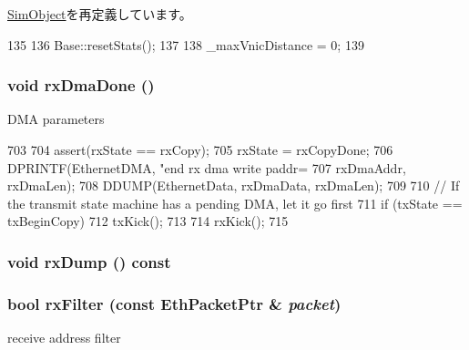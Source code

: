 \hyperlink{classSimObject_a65880e61108132689a1bd769b9187fb7}{SimObject}を再定義しています。


\begin{DoxyCode}
135 {
136     Base::resetStats();
137 
138     _maxVnicDistance = 0;
139 }
\end{DoxyCode}
\hypertarget{classSinic_1_1Device_ae8fff6d9b2bdd860ce365599560f67e7}{
\subsubsection[{rxDmaDone}]{\setlength{\rightskip}{0pt plus 5cm}void rxDmaDone ()}}
\label{classSinic_1_1Device_ae8fff6d9b2bdd860ce365599560f67e7}
DMA parameters 


\begin{DoxyCode}
703 {
704     assert(rxState == rxCopy);
705     rxState = rxCopyDone;
706     DPRINTF(EthernetDMA, "end rx dma write paddr=%
707             rxDmaAddr, rxDmaLen);
708     DDUMP(EthernetData, rxDmaData, rxDmaLen);
709 
710     // If the transmit state machine  has a pending DMA, let it go first
711     if (txState == txBeginCopy)
712         txKick();
713 
714     rxKick();
715 }
\end{DoxyCode}
\hypertarget{classSinic_1_1Device_aa1b380dc961134ace0f88ee7743b32b6}{
\subsubsection[{rxDump}]{\setlength{\rightskip}{0pt plus 5cm}void rxDump () const}}
\label{classSinic_1_1Device_aa1b380dc961134ace0f88ee7743b32b6}
\hypertarget{classSinic_1_1Device_a5bcec2e17f6aca766b063f7a92289bdb}{
\subsubsection[{rxFilter}]{\setlength{\rightskip}{0pt plus 5cm}bool rxFilter (const {\bf EthPacketPtr} \& {\em packet})}}
\label{classSinic_1_1Device_a5bcec2e17f6aca766b063f7a92289bdb}
receive address filter 



